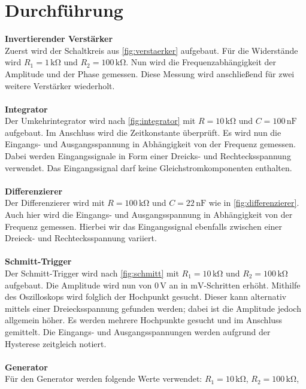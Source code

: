 \section{Durchführung}
\label{sec:Durchführung}

\textbf{Invertierender Verstärker}\\
Zuerst wird der Schaltkreis aus \autoref{fig:verstaerker} aufgebaut. Für die Widerstände wird
$R_1 = 1 \,\unit{\kilo\ohm}$ und $R_2 = 100 \,\unit{\kilo\ohm}$. Nun wird die Frequenzabhängigkeit der
Amplitude und der Phase gemessen. Diese Messung wird anschließend für zwei weitere Verstärker wiederholt. \\
\\
\textbf{Integrator}\\
Der Umkehrintegrator wird nach \autoref{fig:integrator} mit $R = 10\,\unit{\kilo\ohm}$ und 
$C = 100\,\text{nF}$ aufgebaut. Im Anschluss wird die Zeitkonstante überprüft. 
Es wird nun die Eingangs- und Ausgangsspannung in Abhängigkeit von der Frequenz gemessen. 
Dabei werden Eingangssignale in Form einer Dreicks- und Rechtecksspannung verwendet. Das Eingangssignal 
darf keine Gleichstromkomponenten enthalten.\\
\\
\textbf{Differenzierer}\\
Der Differenzierer wird mit $R=100\,\unit{\kilo\ohm}$ und $C=22\,\text{nF}$ wie in \autoref{fig:differenzierer}.
Auch hier wird die Eingangs- und Ausgangsspannung in Abhängigkeit von der Frequenz gemessen. Hierbei wir das Eingangssignal 
ebenfalls zwischen einer Dreieck- und Rechtecksspannung variiert.\\
\\
\textbf{Schmitt-Trigger}\\
Der Schmitt-Trigger wird nach \autoref{fig:schmitt} mit $R_1 = 10\,\unit{\kilo\ohm}$ und
$R_2=100\,\unit{\kilo\ohm}$ aufgebaut. Die Amplitude wird nun von $0\,\unit{\volt}$ an in $\unit{\milli\volt}$-Schritten 
erhöht. Mithilfe des Oszilloskops wird folglich der Hochpunkt gesucht. Dieser kann alternativ mittels einer 
Dreiecksspannung gefunden werden; dabei ist die Amplitude jedoch allgemein höher. Es werden mehrere Hochpunkte gesucht und im Anschluss gemittelt. 
Die Eingangs- und Ausgangsspannungen werden aufgrund der Hysterese zeitgleich notiert. \\
\\
\textbf{Generator}\\
Für den Generator werden folgende Werte verwendet: $R_1= 10\,\unit{\kilo\ohm}$, $R_2=100\,\unit{\kilo\ohm}$,
